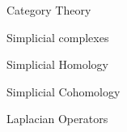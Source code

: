 \documentclass[../main.tex]{subfiles}
\begin{document}
    \begin{section}{Category Theory}
           
    \end{section}
    \begin{section}{Simplicial complexes} 
            
    \end{section}
    \begin{section}{Simplicial Homology}
            
    \end{section}
    \begin{section}{Simplicial Cohomology}
         
    \end{section}
    \begin{section}{Laplacian Operators}
        
    \end{section}
\end{document}
